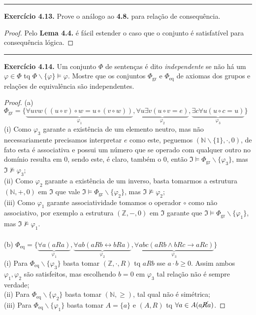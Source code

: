 \documentclass[11pt]{article}
\theoremstyle{definition}
\newcommand{\sse}{\leftrightarrow}
\newcommand{\mf}[1]{\mathfrak{#1}}
\newcommand{\mbb}[1]{\mathbb{#1}}
\begin{document}
\hrule

\textbf{Exercício 4.13.}
Prove o análogo ao \textbf{4.8.} para relação de consequência.

\begin{proof}
    Pelo \textbf{Lema 4.4.} é fácil estender o caso que o conjunto é satisfatível para consequência lógica.
\end{proof}

\hrule

\textbf{Exercício 4.14.}
Um conjunto $\Phi$ de sentenças é dito \textit{independente} se não há um $\varphi\in\Phi$ tq $\Phi\backslash\{\varphi\}\vDash\varphi$. Mostre que os conjuntos $\Phi_\text{gr}$ e $\Phi_\text{eq}$ de axiomas dos grupos e relações de equivalência são independentes.

\begin{proof}
(a) $\Phi_\text{gr} = \{\underbrace{\forall uvw((u\circ v)\circ w=u\circ(v\circ w))}_{\varphi_1},\underbrace{\forall u\exists v(u\circ v=e)}_{\varphi_2},\underbrace{\exists c\forall u(u\circ c=u)}_{\varphi_3}\}$\\
(i) Como $\varphi_3$ garante a existência de um elemento neutro, mas não necessariamente precisamos interpretar $e$ como este, peguemos $(\mbb{N}\backslash\{1\},\cdot,0)$, de fato esta é associativa e possui um número que se operado com qualquer outro no domínio resulta em $0$, sendo este, é claro, também o $0$, então $\mf{I}\vDash\Phi_\text{gr}\backslash\{\varphi_3\}$, mas $\mf{I}\nvDash\varphi_3$; \\
(ii) Como $\varphi_2$ garante a existência de um inverso, basta tomarmos a estrutura $(\mbb{N},+,0)$ em $\mf{I}$ que vale $\mf{I}\vDash\Phi_\text{gr}\backslash\{\varphi_2\}$, mas $\mf{I}\nvDash\varphi_2$;\\
(iii) Como $\varphi_1$ garante associatividade tomamos o operador $\circ$ como não associativo, por exemplo a estrutura $(\mbb{Z},-,0)$ em $\mf{I}$ garante que $\mf{I}\vDash\Phi_\text{gr}\backslash\{\varphi_1\}$, mas $\mf{I}\nvDash\varphi_1$.\\\\
(b) $\Phi_\text{eq} = \{\underbrace{\forall a(aRa)}_{\varphi_1},\underbrace{\forall ab(aRb\sse bRa)}_{\varphi_2},\underbrace{\forall abc(aRb\wedge bRc\to aRc)}_{\varphi_3}\}$\\
(i) Para $\Phi_\text{eq}\backslash\{\varphi_3\}$ basta tomar $(\mbb{Z},\cdot,R)$ tq $aRb$ sse $a\cdot b \ge 0$. Assim ambos $\varphi_1,\varphi_2$ são satisfeitos, mas escolhendo $b=0$ em $\varphi_3$ tal relação não é sempre verdade;\\
(ii) Para $\Phi_\text{eq}\backslash\{\varphi_2\}$ basta tomar $(\mbb{N},\ge)$, tal qual não é simétrica;\\
(iii) Para $\Phi_\text{eq}\backslash\{\varphi_1\}$ basta tomar $A=\{a\}$ e $(A,R)$ tq $\forall a\in A(a\cancel{R}a)$.
\end{proof}
\end{document}
